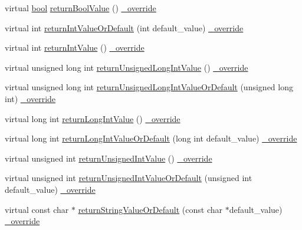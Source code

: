 \begin{DoxyCompactItemize}
\item 
virtual \hyperlink{avb__gptp_8h_af6a258d8f3ee5206d682d799316314b1}{bool} \hyperlink{class_mock_checked_actual_call_ae1dbe3603b0e773c1f34f0dac23513a8}{return\+Bool\+Value} () \hyperlink{_cpp_u_test_config_8h_a049bea15dd750e15869863c94c1efc3b}{\+\_\+override}
\item 
virtual int \hyperlink{class_mock_checked_actual_call_aee0c0fdc138f958a7d8c230d38d6be31}{return\+Int\+Value\+Or\+Default} (int default\+\_\+value) \hyperlink{_cpp_u_test_config_8h_a049bea15dd750e15869863c94c1efc3b}{\+\_\+override}
\item 
virtual int \hyperlink{class_mock_checked_actual_call_a734bbe5a0a6f79b3b54f5998c9856d49}{return\+Int\+Value} () \hyperlink{_cpp_u_test_config_8h_a049bea15dd750e15869863c94c1efc3b}{\+\_\+override}
\item 
virtual unsigned long int \hyperlink{class_mock_checked_actual_call_a8ef63817f8b7b2c156ee662cd90cc2b3}{return\+Unsigned\+Long\+Int\+Value} () \hyperlink{_cpp_u_test_config_8h_a049bea15dd750e15869863c94c1efc3b}{\+\_\+override}
\item 
virtual unsigned long int \hyperlink{class_mock_checked_actual_call_a8e3d1d02eacbe6202fc9bd09a49d0b4a}{return\+Unsigned\+Long\+Int\+Value\+Or\+Default} (unsigned long int) \hyperlink{_cpp_u_test_config_8h_a049bea15dd750e15869863c94c1efc3b}{\+\_\+override}
\item 
virtual long int \hyperlink{class_mock_checked_actual_call_a049f79a4feb62a3f2870f68ead142ef2}{return\+Long\+Int\+Value} () \hyperlink{_cpp_u_test_config_8h_a049bea15dd750e15869863c94c1efc3b}{\+\_\+override}
\item 
virtual long int \hyperlink{class_mock_checked_actual_call_a12208c00f9a9d1803ddfcc9fd98d3f5a}{return\+Long\+Int\+Value\+Or\+Default} (long int default\+\_\+value) \hyperlink{_cpp_u_test_config_8h_a049bea15dd750e15869863c94c1efc3b}{\+\_\+override}
\item 
virtual unsigned int \hyperlink{class_mock_checked_actual_call_aebd9c9f4c64c2c37eeea1dc1e8ab5949}{return\+Unsigned\+Int\+Value} () \hyperlink{_cpp_u_test_config_8h_a049bea15dd750e15869863c94c1efc3b}{\+\_\+override}
\item 
virtual unsigned int \hyperlink{class_mock_checked_actual_call_a8ec8099deff04b565b7268ce70978c8e}{return\+Unsigned\+Int\+Value\+Or\+Default} (unsigned int default\+\_\+value) \hyperlink{_cpp_u_test_config_8h_a049bea15dd750e15869863c94c1efc3b}{\+\_\+override}
\item 
virtual const char $\ast$ \hyperlink{class_mock_checked_actual_call_a75ae12894a17f44c8e5e0d0b4b34626d}{return\+String\+Value\+Or\+Default} (const char $\ast$default\+\_\+value) \hyperlink{_cpp_u_test_config_8h_a049bea15dd750e15869863c94c1efc3b}{\+\_\+override}

\end{DoxyCompactItemize}
